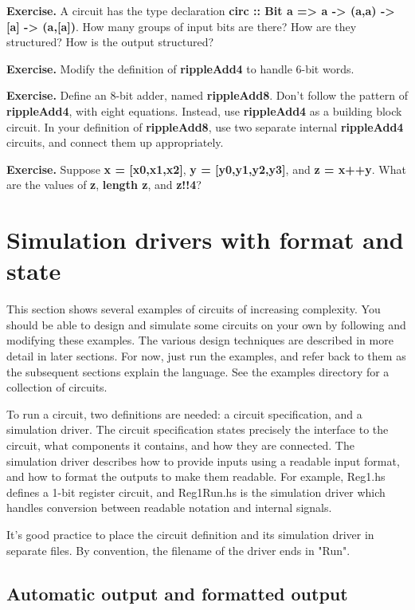 \documentclass[11pt]{article}
\begin{document}
\textbf{\textbf{Exercise.}}
A circuit has the type declaration \textbf{circ :: Bit a => a
    -> (a,a) -> [a] -> (a,[a])}.  How many groups of input bits are
  there?  How are they structured?  How is the output structured?

\textbf{\textbf{Exercise.}} Modify the definition of \textbf{rippleAdd4} to handle 6-bit
words.

\textbf{\textbf{Exercise.}} Define an 8-bit adder, named \textbf{rippleAdd8}.  Don't follow
the pattern of \textbf{rippleAdd4}, with eight equations.  Instead, use
\textbf{rippleAdd4} as a building block circuit.  In your definition of
\textbf{rippleAdd8}, use two separate internal \textbf{rippleAdd4} circuits, and
connect them up appropriately.

\textbf{\textbf{Exercise.}} Suppose \textbf{x = [x0,x1,x2]}, \textbf{y = [y0,y1,y2,y3]}, and \textbf{z =
  x++y}.  What are the values of \textbf{z}, \textbf{length z}, and \textbf{z!!4}?


\section{Simulation drivers with format and state}
\label{sec:org05d5d49}

This section shows several examples of circuits of increasing
complexity.  You should be able to design and simulate some circuits on
your own by following and modifying these examples.  The various
design techniques are described in more detail in later sections.  For
now, just run the examples, and refer back to them as the subsequent
sections explain the language.  See the examples directory for a
collection of circuits.

To run a circuit, two definitions are needed: a circuit specification,
and a simulation driver.  The circuit specification states precisely
the interface to the circuit, what components it contains, and how
they are connected.  The simulation driver describes how to provide
inputs using a readable input format, and how to format the outputs to
make them readable.  For example, Reg1.hs defines a 1-bit register
circuit, and Reg1Run.hs is the simulation driver which handles
conversion between readable notation and internal signals.

It's good practice to place the circuit definition and its simulation
driver in separate files.  By convention, the filename of the driver
ends in "Run".

\subsection{Automatic output and formatted output}
\label{sec:org4b2e6ef}
\end{document}
